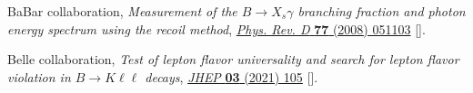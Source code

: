 \documentclass{moriond}
\begin{document}
\begin{thebibliography}{99}
{BaBar} collaboration, \emph{{Measurement of the $B \to X_s \gamma$ branching
  fraction and photon energy spectrum using the recoil method}},
  \href{https://doi.org/10.1103/PhysRevD.77.051103}{\emph{Phys. Rev. D}
  {\bfseries 77} (2008) 051103}
  [\href{https://arxiv.org/abs/0711.4889}{{}}].

{Belle} collaboration, \emph{{Test of lepton flavor universality and search for
  lepton flavor violation in $B \rightarrow K\ell \ell$ decays}},
  \href{https://doi.org/10.1007/JHEP03(2021)105}{\emph{JHEP} {\bfseries 03}
  (2021) 105} [\href{https://arxiv.org/abs/1908.01848}{{}}].
\end{thebibliography}
\end{document}
